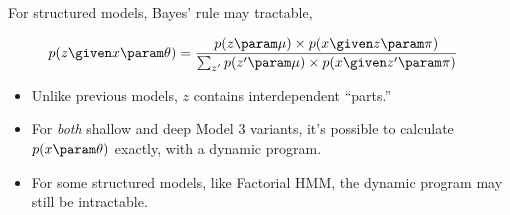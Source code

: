 \begin{frame}
    
    
    For structured models, Bayes' rule may tractable,

    \begin{align*}
    p(z \given x \param \theta) 
    &= \frac{p(z \param \mu) \times p(x \given z \param \pi)}{\sum_{z'} p(z' \param \mu) \times p(x \given z' \param \pi)}
\end{align*}

\air
\air

\pause
\begin{itemize}
    \item Unlike previous models, $z$ contains interdependent ``parts.''
    \item For \textit{both} shallow and deep Model 3 variants, it's possible to calculate $p(x \param \theta)$ exactly, with a dynamic program.
    \item For some structured models, like Factorial HMM, the dynamic program may still be intractable.
\end{itemize}  
    
\end{frame}